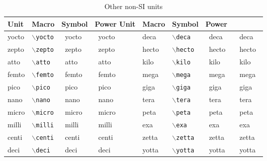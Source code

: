 \documentclass{article}
\begin{document}
\def\showprefix#1{#1 & \texttt{$\backslash$#1} & \si{\csname#1\endcsname} & \si[prefixes-as-symbols=false]{\csname#1\endcsname}}
\begin{table}
\caption{Other non-SI units}
\centering
\begin{tabular}{llllllll}\hline\hline
Unit & Macro & Symbol & Power
Unit & Macro & Symbol & Power \\\hline
\showprefix{yocto} & \showprefix{deca}\\
\showprefix{zepto} & \showprefix{hecto}\\
\showprefix{atto}  & \showprefix{kilo}\\
\showprefix{femto} & \showprefix{mega}\\
\showprefix{pico}  & \showprefix{giga}\\
\showprefix{nano}  & \showprefix{tera}\\
\showprefix{micro} & \showprefix{peta}\\
\showprefix{milli} & \showprefix{exa}\\
\showprefix{centi} & \showprefix{zetta}\\
\showprefix{deci}  & \showprefix{yotta}\\
\end{tabular}
\end{table}
\end{document}
